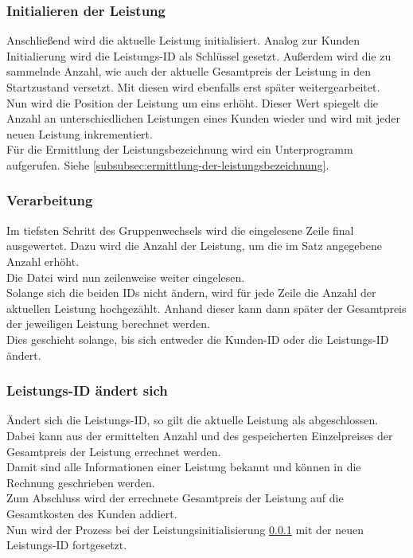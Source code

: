 \subsubsection{Initialieren der Leistung}\label{subsubsec:initialisieren-der-leistung}
Anschließend wird die aktuelle Leistung initialisiert. Analog zur Kunden Initialierung wird die Leistungs-ID als Schlüssel gesetzt. Außerdem wird die zu sammelnde Anzahl, wie auch der aktuelle Gesamtpreis der Leistung in den Startzustand versetzt. Mit diesen wird ebenfalls erst später weitergearbeitet.\\
Nun wird die Position der Leistung um eins erhöht. Dieser Wert spiegelt die Anzahl an unterschiedlichen Leistungen eines Kunden wieder und wird mit jeder neuen Leistung inkrementiert.\\
Für die Ermittlung der Leistungsbezeichnung wird ein Unterprogramm aufgerufen. Siehe \ref{subsubsec:ermittlung-der-leistungsbezeichnung}.\\

\subsubsection{Verarbeitung}
Im tiefsten Schritt des Gruppenwechsels wird die eingelesene Zeile final ausgewertet. Dazu wird die Anzahl der Leistung, um die im Satz angegebene Anzahl erhöht.\\
Die Datei wird nun zeilenweise weiter eingelesen.\\
Solange sich die beiden IDs nicht ändern, wird für jede Zeile die Anzahl der aktuellen Leistung hochgezählt. Anhand dieser kann dann später der Gesamtpreis der jeweiligen Leistung berechnet werden.\\
Dies geschieht solange, bis sich entweder die Kunden-ID oder die Leistungs-ID ändert.

\subsubsection{Leistungs-ID ändert sich}\label{subsubsec:leistungs-id-aendert-sich}
Ändert sich die Leistungs-ID, so gilt die aktuelle Leistung als abgeschlossen. Dabei kann aus der ermittelten Anzahl und des gespeicherten Einzelpreises der Gesamtpreis der Leistung errechnet werden.\\
Damit sind alle Informationen einer Leistung bekannt und können in die Rechnung geschrieben werden.\\
Zum Abschluss wird der errechnete Gesamtpreis der Leistung auf die Gesamtkosten des Kunden addiert.\\
Nun wird der Prozess bei der Leistungsinitialisierung \ref{subsubsec:initialisieren-der-leistung} mit der neuen Leistungs-ID fortgesetzt.\\

